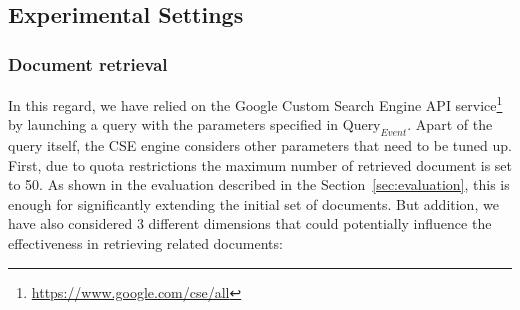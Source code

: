 \documentclass{llncs}
\begin{document}
\subsection{Experimental Settings}
\label{sec:experimentalSettings}

\subsubsection{Document retrieval}
In this regard, we have relied on the Google Custom Search Engine API service\footnote{\fontsize{8pt}{1em}\selectfont  \url{https://www.google.com/cse/all}} by launching a query with the parameters specified in $\text{Query}_{Event}$. Apart of the query itself, the CSE engine considers other parameters that need to be tuned up. First, due to quota restrictions the maximum number of retrieved document is set to 50. As shown in the evaluation described in the Section~\ref{sec:evaluation}, this is enough for significantly extending the initial set of documents. But addition, we have also considered 3 different dimensions that could potentially influence the effectiveness in retrieving related documents:
\end{document}
